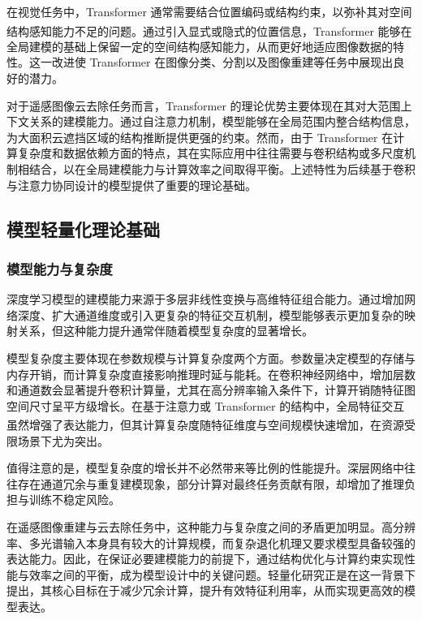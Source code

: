 在视觉任务中，Transformer 通常需要结合位置编码或结构约束，以弥补其对空间结构感知能力不足的问题。通过引入显式或隐式的位置信息\textsuperscript{\cite{liu2021swin}}，Transformer 能够在全局建模的基础上保留一定的空间结构感知能力，从而更好地适应图像数据的特性。这一改进使 Transformer 在图像分类、分割以及图像重建等任务中展现出良好的潜力。

对于遥感图像云去除任务而言，Transformer 的理论优势主要体现在其对大范围上下文关系的建模能力。通过自注意力机制，模型能够在全局范围内整合结构信息，为大面积云遮挡区域的结构推断提供更强的约束。然而，由于 Transformer 在计算复杂度和数据依赖方面的特点，其在实际应用中往往需要与卷积结构或多尺度机制相结合，以在全局建模能力与计算效率之间取得平衡。上述特性为后续基于卷积与注意力协同设计的模型提供了重要的理论基础。

\subsection{模型轻量化理论基础}

\subsubsection{模型能力与复杂度}

深度学习模型的建模能力来源于多层非线性变换与高维特征组合能力。通过增加网络深度、扩大通道维度或引入更复杂的特征交互机制，模型能够表示更加复杂的映射关系，但这种能力提升通常伴随着模型复杂度的显著增长。

模型复杂度主要体现在参数规模与计算复杂度两个方面。参数量决定模型的存储与内存开销，而计算复杂度直接影响推理时延与能耗。在卷积神经网络中，增加层数和通道数会显著提升卷积计算量，尤其在高分辨率输入条件下，计算开销随特征图空间尺寸呈平方级增长。在基于注意力或 Transformer 的结构中，全局特征交互虽然增强了表达能力，但其计算复杂度随特征维度与空间规模快速增加\textsuperscript{\cite{dosovitskiy2020image}}，在资源受限场景下尤为突出。

值得注意的是，模型复杂度的增长并不必然带来等比例的性能提升。深层网络中往往存在通道冗余与重复建模现象，部分计算对最终任务贡献有限，却增加了推理负担与训练不稳定风险。

在遥感图像重建与云去除任务中，这种能力与复杂度之间的矛盾更加明显。高分辨率、多光谱输入本身具有较大的计算规模，而复杂退化机理又要求模型具备较强的表达能力。因此，在保证必要建模能力的前提下，通过结构优化与计算约束实现性能与效率之间的平衡，成为模型设计中的关键问题。轻量化研究正是在这一背景下提出，其核心目标在于减少冗余计算，提升有效特征利用率，从而实现更高效的模型表达。

